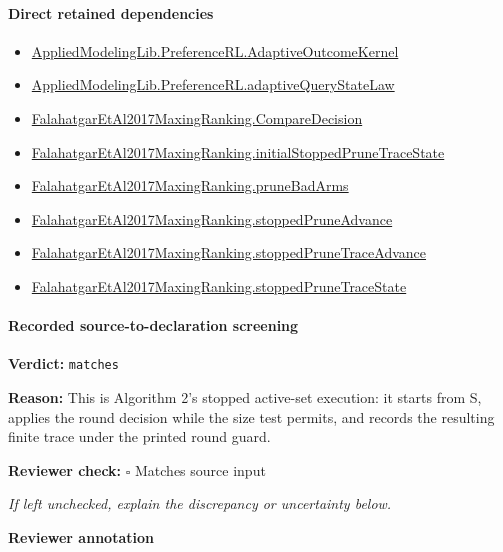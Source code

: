 \documentclass[10pt]{article}
\newcommand{\reviewerbox}{%
  \par\noindent\fbox{\parbox{0.96\linewidth}{\rule{0pt}{0.38in}}}\par
}
\newcommand{\reviewmatch}[1]{%
  \par\noindent\textbf{Reviewer check:} $\square$\; #1\par
  \noindent\emph{If left unchecked, explain the discrepancy or uncertainty below.}\par
}
\begin{document}
\paragraph{Direct retained dependencies}
\begin{itemize}\raggedright
\item \hyperlink{governing-declaration-1bbfda940769438f}{Applied\allowbreak{}Modeling\allowbreak{}Lib.\allowbreak{}Preference\allowbreak{}RL.\allowbreak{}Adaptive\allowbreak{}Outcome\allowbreak{}Kernel}
\item \hyperlink{governing-declaration-74857dd57d655793}{Applied\allowbreak{}Modeling\allowbreak{}Lib.\allowbreak{}Preference\allowbreak{}RL.\allowbreak{}adaptive\allowbreak{}Query\allowbreak{}State\allowbreak{}Law}
\item \hyperlink{governing-declaration-3723216c72fc3dc8}{Falahatgar\allowbreak{}Et\allowbreak{}Al2017\allowbreak{}Maxing\allowbreak{}Ranking.\allowbreak{}Compare\allowbreak{}Decision}
\item \hyperlink{governing-declaration-5c8b7edc1c009a01}{Falahatgar\allowbreak{}Et\allowbreak{}Al2017\allowbreak{}Maxing\allowbreak{}Ranking.\allowbreak{}initial\allowbreak{}Stopped\allowbreak{}Prune\allowbreak{}Trace\allowbreak{}State}
\item \hyperlink{governing-declaration-28c25fd6e78c3d69}{Falahatgar\allowbreak{}Et\allowbreak{}Al2017\allowbreak{}Maxing\allowbreak{}Ranking.\allowbreak{}prune\allowbreak{}Bad\allowbreak{}Arms}
\item \hyperlink{governing-declaration-062cd2cfacd2fb26}{Falahatgar\allowbreak{}Et\allowbreak{}Al2017\allowbreak{}Maxing\allowbreak{}Ranking.\allowbreak{}stopped\allowbreak{}Prune\allowbreak{}Advance}
\item \hyperlink{governing-declaration-e0ac55e8a5771efa}{Falahatgar\allowbreak{}Et\allowbreak{}Al2017\allowbreak{}Maxing\allowbreak{}Ranking.\allowbreak{}stopped\allowbreak{}Prune\allowbreak{}Trace\allowbreak{}Advance}
\item \hyperlink{governing-declaration-bb5991f407529737}{Falahatgar\allowbreak{}Et\allowbreak{}Al2017\allowbreak{}Maxing\allowbreak{}Ranking.\allowbreak{}stopped\allowbreak{}Prune\allowbreak{}Trace\allowbreak{}State}
\end{itemize}
\paragraph{Recorded source-to-declaration screening}
\textbf{Verdict:} \texttt{matches}
\\
{\raggedright
\textbf{Reason:} This is Algorithm 2's stopped active-\allowbreak{}set execution:\allowbreak{} it starts from S, applies the round decision while the size test permits, and records the resulting finite trace under the printed round guard.\allowbreak{}
\par}
\reviewmatch{Matches source input}
\noindent\textbf{Reviewer annotation}\par
\reviewerbox
\clearpage
\hypertarget{paper-prerequisite-d3997dc015284b43}{}
\end{document}
